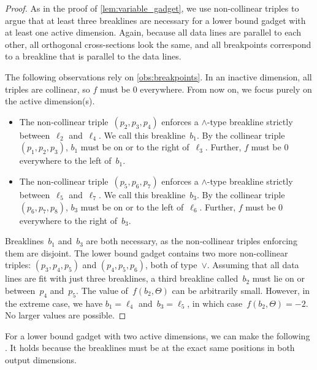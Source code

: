 \documentclass{toc}
\begin{document}
\begin{proof}
    As in the proof of \cref{lem:variable_gadget}, we use non-collinear triples to argue that at least three breaklines are necessary for a lower bound gadget with at least one active dimension.
    Again, because all data lines are parallel to each other, all orthogonal cross-sections look the same, and all breakpoints correspond to a breakline that is parallel to the data lines.

    The following observations rely on \cref{obs:breakpoints}.
    In an inactive dimension, all triples are collinear, so $f$ must be 
%
$0$ everywhere. 
    From now on, we focus purely on the active dimension(s).
    \begin{itemize}
        \item The non-collinear triple~$(p_2, p_3, p_4)$ enforces a $\wedge$-type breakline strictly between~$\ell_2$ and~$\ell_4$.
        We call this breakline~$b_1$.
        By the collinear triple~$(p_1, p_2, p_3)$, $b_1$ must be on or to the right of~$\ell_3$.
        Further, $f$ must be %
        $0$ everywhere  %
to the left of~$b_1$.

        \item The non-collinear triple~$(p_5, p_6, p_7)$ enforces a $\wedge$-type breakline strictly between~$\ell_5$ and~$\ell_7$.
     We call this breakline~$b_3$.
     By the collinear triple~$(p_6, p_7, p_8)$, $b_3$ must be on or to the left of~$\ell_6$.
     Further, $f$ must be %
$0$ everywhere %
to the right of~$b_3$.
    \end{itemize}
    Breaklines~$b_1$ and~$b_3$ are both necessary, as the non-collinear triples enforcing them are disjoint.
    The lower bound gadget contains two more non-collinear triples:
    $(p_3, p_4, p_5)$ and $(p_4, p_5, p_6)$, both of type~$\vee$.
    Assuming that all data lines are fit with just three breaklines, a third breakline called~$b_2$ must lie on or between~$p_4$ and~$p_5$.
    The value of~$f(b_2, \Theta)$ can be arbitrarily small.
    However, in the extreme case, %
    we have  %
    $b_1 = \ell_4$ and~$b_3 = \ell_5$, in which case~$f(b_2, \Theta) = -2$.
    No larger values are possible.
\end{proof}

For a lower bound gadget with two active dimensions, we can make the following .
It holds because the breaklines must be at the exact same positions in both output dimensions.

\end{document}
